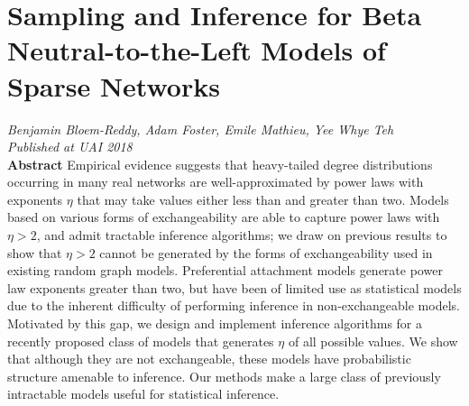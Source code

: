 \section{Sampling and Inference for Beta Neutral-to-the-Left Models of Sparse Networks}
\textit{Benjamin Bloem-Reddy, Adam Foster, Emile Mathieu, Yee Whye Teh \\
	Published at UAI 2018 \\
}
\textbf{Abstract}  Empirical evidence suggests that heavy-tailed degree distributions occurring in many real networks are well-approximated by power laws with exponents $\eta$ that may take values either less than and greater than two. Models based on various forms of exchangeability are able to capture power laws with $\eta > 2$, and admit tractable inference algorithms; we draw on previous results to show that $\eta > 2$ cannot be generated by the forms of exchangeability used in existing random graph models. Preferential attachment models generate power law exponents greater than two, but have been of limited use as statistical models due to the inherent difficulty of performing inference in non-exchangeable models. Motivated by this gap, we design and implement inference algorithms for a recently proposed class of models that generates $\eta$ of all possible values. We show that although they are not exchangeable, these models have probabilistic structure amenable to inference. Our methods make a large class of previously intractable models useful for statistical inference. 